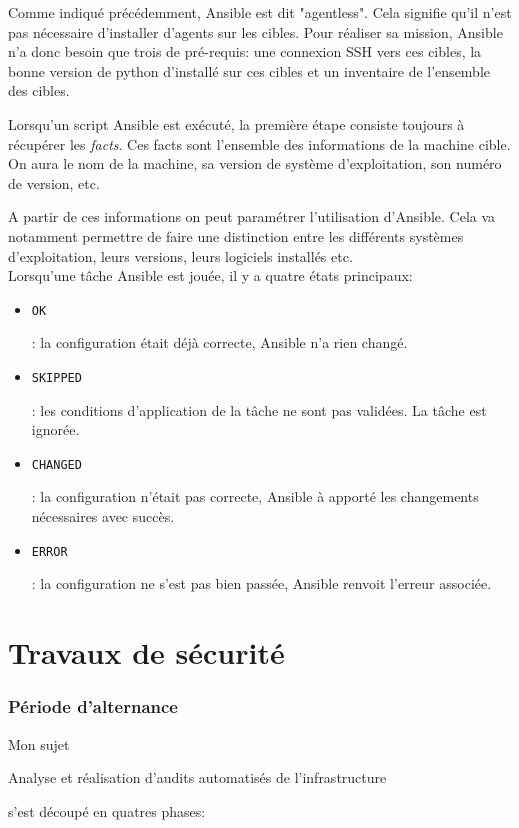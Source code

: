 \documentclass[12pt, a4paper, twoside]{article}
\begin{document}
Comme indiqué précédemment, \gls{Ansible} est dit "agentless". 
Cela signifie qu'il n'est pas nécessaire d'installer d'agents sur les cibles. 
Pour réaliser sa mission, \gls{Ansible} n'a donc besoin que trois de pré-requis:  une connexion SSH vers ces cibles, la bonne version de python d'installé sur ces cibles et un inventaire de l'ensemble des cibles. 

Lorsqu'un script \gls{Ansible} est exécuté, la première étape consiste toujours à récupérer les \textit{facts}. 
Ces facts sont l'ensemble des informations de la machine cible. 
On aura le nom de la machine, sa version de système d'exploitation, son numéro de version, etc. 

A partir de ces informations on peut paramétrer l'utilisation d'\gls{Ansible}. 
Cela va notamment permettre de faire une distinction entre les différents systèmes d'exploitation, leurs versions, leurs logiciels installés etc.  \\

Lorsqu'une tâche \gls{Ansible} est jouée, il y a quatre états principaux:
\begin{itemize}
    \item \begin{code}\texttt{OK}\end{code}: la configuration était déjà correcte, \gls{Ansible} n'a rien changé.
    \item \begin{code}\texttt{SKIPPED}\end{code}: les conditions d'application de la tâche ne sont pas validées. La tâche est ignorée.
    \item \begin{code}\texttt{CHANGED}\end{code}: la configuration n'était pas correcte, \gls{Ansible} à apporté les changements nécessaires avec succès.
    \item \begin{code}\texttt{ERROR}\end{code}: la configuration ne s'est pas bien passée, \gls{Ansible} renvoit l'erreur associée.
\end{itemize}

\newpage
\part{Travaux de sécurité}
\section{Période d'alternance}
Mon sujet \begin{hilite} Analyse et réalisation d'audits automatisés de l'infrastructure \end{hilite} s'est découpé en quatres phases:
\end{document}
